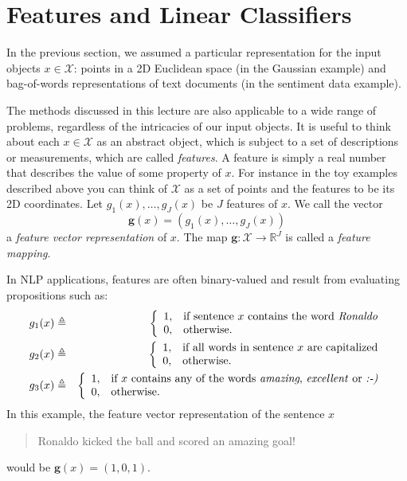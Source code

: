 \section{Features and Linear Classifiers}\label{sec:linearclass}

In the previous section, we assumed a particular representation for 
the input objects  $x \in \mathcal{X}$: points in a 2D Euclidean space 
(in the Gaussian example) and bag-of-words representations of text 
documents (in the sentiment data example). 

The methods discussed in this lecture are also applicable to a 
wide range of problems, regardless of the intricacies of our input objects. 
It is useful to think about each  $x \in \mathcal{X}$ as an abstract object, 
which is subject to a set of descriptions or measurements, which are called \emph{features}.  
A feature is simply a real number that describes the value of some
property of $x$. 
For instance in the toy examples described above you can think of $\mathcal{X}$
as a set of points and the features to be its 2D coordinates.
Let $g_1(x),\ldots,g_J(x)$ be $J$ features of $x$. We call the vector
\begin{equation}
\boldsymbol{g}(x) = (g_1(x),\ldots,g_J(x))
\end{equation} 
a \emph{feature vector representation} of $x$. 
The map $\boldsymbol{g}:\mathcal{X}\rightarrow \mathbb{R}^J$ is called a \emph{feature mapping}. 

In NLP applications, features are often binary-valued and 
result from evaluating propositions such as: 
\begin{eqnarray}
g_1(x) &\triangleq& 
\left\{
\begin{array}{ll}
1, & \text{if sentence $x$ contains the word \emph{Ronaldo}}\\
0, & \text{otherwise.}
\end{array}
\right.\\
g_2(x) &\triangleq& 
\left\{
\begin{array}{ll}
1, & \text{if all words in sentence $x$ are capitalized}\\
0, & \text{otherwise.}
\end{array}
\right.\\
g_3(x) &\triangleq& 
\left\{
\begin{array}{ll}
1, & \text{if $x$ contains any of the words \emph{amazing}, \emph{excellent} or \emph{:-)}}\\
0, & \text{otherwise.}
\end{array}
\right.
\end{eqnarray}  
In this example, the feature vector representation of the sentence $x$
\begin{quote}
Ronaldo kicked the ball and scored an amazing goal! 
\end{quote}
would be $\boldsymbol{g}(x) = (1,0,1)$. 

